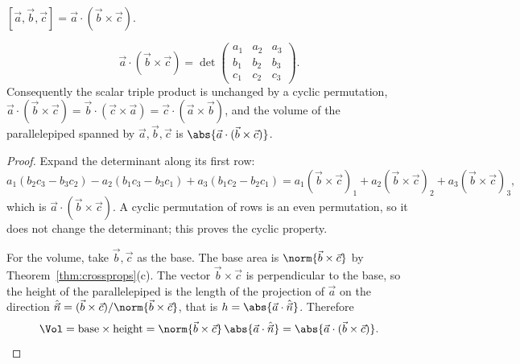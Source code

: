 \begin{definition}
$[\vec a,\vec b,\vec c]=\vec a\cdot(\vec b\times\vec c)$.
\end{definition}

\begin{theorem}\label{thm:triple}
\[
\vec a\cdot(\vec b\times\vec c)=\det\begin{pmatrix}a_1&a_2&a_3\\b_1&b_2&b_3\\c_1&c_2&c_3\end{pmatrix}.
\]
Consequently the scalar triple product is unchanged by a cyclic permutation, $\vec a\cdot(\vec b\times\vec c)=\vec b\cdot(\vec c\times\vec a)=\vec c\cdot(\vec a\times\vec b)$, and the volume of the parallelepiped spanned by $\vec a,\vec b,\vec c$ is $\abs{\vec a\cdot(\vec b\times\vec c)}$.
\end{theorem}

\begin{proof}
Expand the determinant along its first row:
\[
a_1(b_2c_3-b_3c_2)-a_2(b_1c_3-b_3c_1)+a_3(b_1c_2-b_2c_1)=a_1(\vec b\times\vec c)_1+a_2(\vec b\times\vec c)_2+a_3(\vec b\times\vec c)_3,
\]
which is $\vec a\cdot(\vec b\times\vec c)$. A cyclic permutation of rows is an even permutation, so it does not change the determinant; this proves the cyclic property.

For the volume, take $\vec b,\vec c$ as the base. The base area is $\norm{\vec b\times\vec c}$ by Theorem~\ref{thm:crossprops}(c). The vector $\vec b\times\vec c$ is perpendicular to the base, so the height of the parallelepiped is the length of the projection of $\vec a$ on the direction $\hat{\vec n}=(\vec b\times\vec c)/\norm{\vec b\times\vec c}$, that is $h=\abs{\vec a\cdot\hat{\vec n}}$. Therefore
\[
\Vol=\text{base}\times\text{height}=\norm{\vec b\times\vec c}\,\abs{\vec a\cdot\hat{\vec n}}=\abs{\vec a\cdot(\vec b\times\vec c)}. \qedhere
\]
\end{proof}

